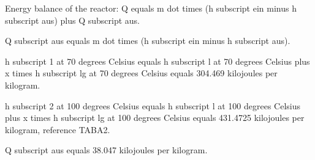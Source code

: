 Energy balance of the reactor: Q equals m dot times (h subscript ein minus h subscript aus) plus Q subscript aus.

Q subscript aus equals m dot times (h subscript ein minus h subscript aus).

h subscript 1 at 70 degrees Celsius equals h subscript l at 70 degrees Celsius plus x times h subscript lg at 70 degrees Celsius equals 304.469 kilojoules per kilogram.

h subscript 2 at 100 degrees Celsius equals h subscript l at 100 degrees Celsius plus x times h subscript lg at 100 degrees Celsius equals 431.4725 kilojoules per kilogram, reference TABA2.

Q subscript aus equals 38.047 kilojoules per kilogram.